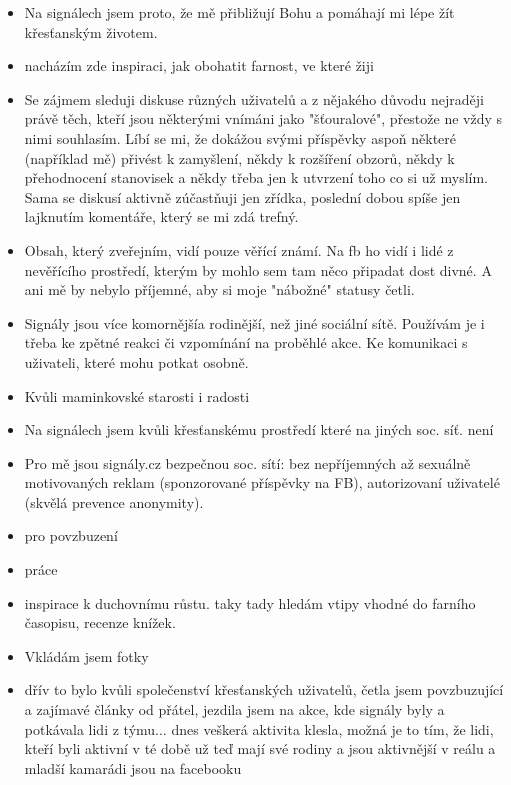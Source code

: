 \begin{itemize}
\item Na signálech jsem proto, že mě přibližují Bohu a pomáhají mi lépe žít křesťanským životem.

\item nacházím zde inspiraci, jak obohatit farnost, ve které žiji

\item Se zájmem sleduji diskuse různých uživatelů a z nějakého důvodu nejraději právě těch, kteří jsou některými vnímáni jako "šťouralové", přestože ne vždy s nimi souhlasím. Líbí se mi, že dokážou svými příspěvky aspoň některé (například mě) přivést k zamyšlení, někdy k rozšíření obzorů, někdy k přehodnocení stanovisek a někdy třeba jen k utvrzení toho co si už myslím. Sama se diskusí aktivně zúčastňuji jen zřídka, poslední dobou spíše jen lajknutím komentáře, který se mi zdá trefný.

\item Obsah, který zveřejním, vidí pouze věřící známí. Na fb ho vidí i lidé z nevěřícího prostředí, kterým by mohlo sem tam něco připadat dost divné. A ani mě by nebylo příjemné, aby si moje "nábožné" statusy četli.

\item Signály jsou více komornějšía  rodinější, než jiné sociální sítě. Používám je i třeba ke zpětné reakci či vzpomínání na proběhlé akce. Ke komunikaci s uživateli, které mohu potkat osobně.

\item Kvůli maminkovské starosti i radosti

\item Na signálech jsem kvůli křesťanskému prostředí které na jiných soc. síť. není

\item Pro mě jsou signály.cz bezpečnou soc. sítí: bez nepříjemných až sexuálně motivovaných reklam (sponzorované příspěvky na FB), autorizovaní uživatelé (skvělá prevence anonymity).

\item pro povzbuzení

\item práce

\item inspirace k duchovnímu růstu. taky tady hledám vtipy vhodné do farního časopisu, recenze knížek.

\item Vkládám jsem fotky

\item dřív to bylo kvůli společenství křesťanských uživatelů, četla jsem povzbuzující a zajímavé články od přátel, jezdila jsem na akce, kde signály byly a potkávala lidi z týmu... dnes veškerá aktivita klesla, možná je to tím, že lidi, kteří byli aktivní v té době už teď mají své rodiny a jsou aktivnější v reálu a mladší kamarádi jsou na facebooku


\end{itemize}
